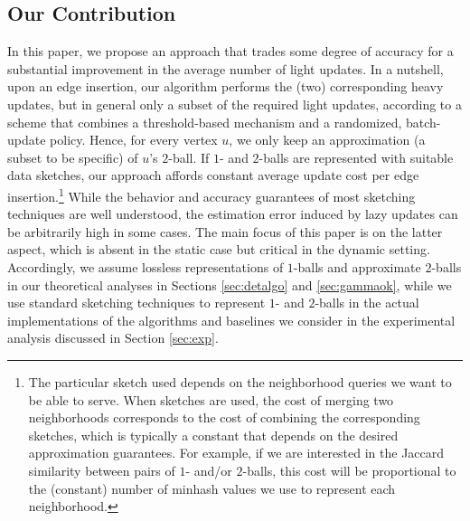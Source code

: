 \subsection{Our Contribution}
In this paper, we propose an approach that trades some degree of accuracy for a substantial improvement in the average number of light updates. In a nutshell, upon an edge insertion, our algorithm performs the (two) corresponding heavy updates, but in general only a subset of the required light updates, according to a scheme that combines a threshold-based mechanism and a randomized, batch-update policy. Hence, for every vertex $u$, we only keep an approximation (a subset to be specific) of $u$'s $2$-ball. If $1$- and $2$-balls are represented with suitable data sketches, our approach affords constant average update cost per edge insertion.\footnote{The particular sketch used depends on the neighborhood queries we want to be able to serve. When sketches are used, the cost of merging two neighborhoods corresponds to the cost of combining the corresponding sketches, which is typically a constant that depends on the desired approximation guarantees. For example, if we are interested in the Jaccard similarity between pairs of $1$- and/or $2$-balls, this cost will be proportional to the (constant) number of minhash values we use to represent each neighborhood.} While the behavior and accuracy guarantees of most sketching techniques are well understood, the estimation error induced by lazy updates can be arbitrarily high in some cases. The main focus of this paper is on the latter aspect, which is absent in the static case but critical in the dynamic setting. Accordingly, we assume lossless representations of $1$-balls and approximate $2$-balls in our theoretical analyses in Sections \ref{sec:detalgo} and \ref{sec:gammaok}, while we use  standard sketching techniques to represent $1$- and $2$-balls in the actual implementations of the algorithms and baselines we consider in the experimental analysis discussed in Section \ref{sec:exp}.



